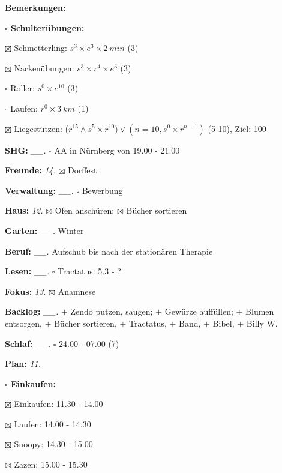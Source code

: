 \documentclass[10pt,a4paper]{article}
\newcommand\prop[1] {{\color {alizarin} {\bf #1}}}        %
\newcommand\mand[1] {{\color {burntorange} {\bf #1}}}     %
\newcommand\topspace{\vskip -15pt \hskip 20pt}
\newcommand\bottomspace{\vskip 4pt}
\newcommand\n[1] { {\sl #1.} \hskip 5pt }
\begin{document}
\begin{mdframed}[style=daystyle]
\begin{labeling}{{\mand {Bemerkungen:}}}
\begin{minipage}{0.75\textwidth}
\begin{labeling}{\prop {$\square$ {Schulterübungen:}}}
      \item[$\boxtimes$ Schmetterling:]   $s^3 \times e^3 \times 2\ min$ (3)
      \item[$\boxtimes$ Nackenübungen:]   $s^3 \times r^4 \times e^3$ (3)
      \item[$\square$ Roller:]          $s^0 \times e^{10}$ (3)
      \item[$\square$ Laufen:]          $r^0 \times 3\ km$ (1)
      \item[$\boxtimes$ Liegestützen:]    ($r^{15} \land s^5 \times r^{10}) \vee (n=10, s^0 \times r^{n-1})$ (5-10), Ziel: 100
      \end{labeling}
    \end{minipage}
    \bottomspace        
  \item[{\mand {SHG:}}]          \n{\_\_} $\square$ AA in Nürnberg von 19.00 - 21.00
  \item[{\mand {Freunde:}}]        \n{14} $\boxtimes$ Dorffest
  \item[{\mand {Verwaltung:}}]   \n{\_\_} $\square$ Bewerbung
  \item[{\mand {Haus:}}]           \n{12} $\boxtimes$ Ofen anschüren; $\boxtimes$ Bücher sortieren
  \item[{\mand {Garten:}}]       \n{\_\_} Winter
  \item[{\mand {Beruf:}}]        \n{\_\_} Aufschub bis nach der stationären Therapie
  \item[{\mand {Lesen:}}]        \n{\_\_} $\square$ Tractatus: 5.3 - ?
  \item[{\mand {Fokus:}}]          \n{13} $\boxtimes$ Anamnese
  \item[{\mand {Backlog:}}]      \n{\_\_} 
      $+$ Zendo putzen, saugen; $+$ Gewürze auffüllen; $+$ Blumen entsorgen, $+$ Bücher sortieren,
      $+$ Tractatus, $+$ Band, $+$ Bibel, $+$ Billy W.
  \item[{\mand {Schlaf:}}]       \n{\_\_} $\square$ 24.00 - 07.00 (7)
  \item[{\mand {Plan:}}]           \n{11}
    \topspace
    \begin{minipage}{0.75\textwidth}  
      \begin{labeling}{\prop {$\square$ {Einkaufen:}}} 
        \setlength\itemsep{-3pt}
      \item[$\boxtimes$ Einkaufen:]  11.30 - 14.00
      \item[$\boxtimes$ Laufen:]     14.00 - 14.30
      \item[$\boxtimes$ Snoopy:]     14.30 - 15.00
      \item[$\boxtimes$ Zazen:]      15.00 - 15.30

\end{labeling}
\end{minipage}
\end{labeling}
\end{mdframed}
\end{document}
